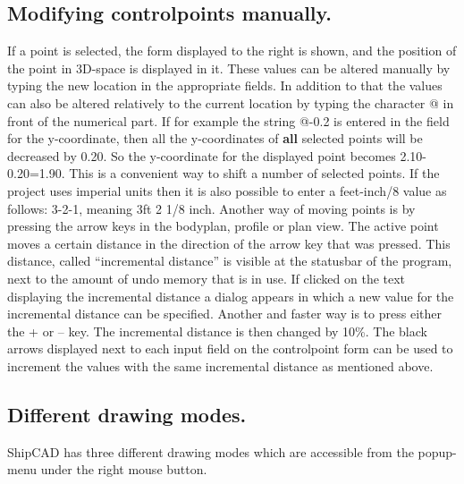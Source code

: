 \documentclass[12pt]{article}
\begin{document}
\subsection{Modifying controlpoints manually.}
If a point is selected, the form displayed to the right is shown, and
the position of the point in 3D-space is displayed in it. These values
can be altered manually by typing the new location in the appropriate
fields. In addition to that the values can also be altered relatively
to the current location by typing the character @ in front of the
numerical part. If for example the string @-0.2 is entered in the
field for the y-coordinate, then all the y-coordinates of \textbf{all}
selected points will be decreased by 0.20. So the y-coordinate for the
displayed point becomes 2.10-0.20=1.90. This is a convenient way to
shift a number of selected points. If the project uses imperial units
then it is also possible to enter a feet-inch/8 value as follows:
3-2-1, meaning 3ft 2 1/8 inch.  Another way of moving points is by
pressing the arrow keys in the bodyplan, profile or plan view.  The
active point moves a certain distance in the direction of the arrow
key that was pressed. This distance, called “incremental distance” is
visible at the statusbar of the program, next to the amount of undo
memory that is in use. If clicked on the text displaying the
incremental distance a dialog appears in which a new value for the
incremental distance can be specified. Another and faster way is to
press either the + or – key. The incremental distance is then changed
by 10\%.  The black arrows displayed next to each input field on the
controlpoint form can be used to increment the values with the same
incremental distance as mentioned above.

\subsection{Different drawing modes.}
ShipCAD has three different drawing modes which are accessible from the popup-menu under the
right mouse button.
\end{document}
